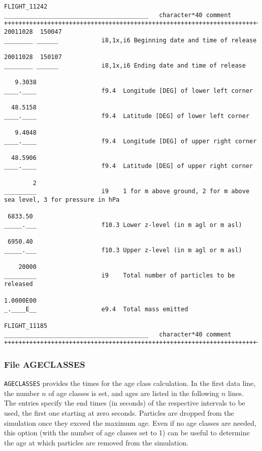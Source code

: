 \documentclass{egu}            %
\begin{document}
\begin{scriptsize}
\begin{verbatim}
FLIGHT_11242
________________________________________   character*40 comment
+++++++++++++++++++++++++++++++++++++++++++++++++++++++++++++++++++++++++
20011028  150047
________ ______            i8,1x,i6 Beginning date and time of release

20011028  150107
________ ______            i8,1x,i6 Ending date and time of release

   9.3038 
____.____                  f9.4  Longitude [DEG] of lower left corner

  48.5158
____.____                  f9.4  Latitude [DEG] of lower left corner

   9.4048
____.____                  f9.4  Longitude [DEG] of upper right corner

  48.5906
____.____                  f9.4  Latitude [DEG] of upper right corner

        2
_________                  i9    1 for m above ground, 2 for m above sea level, 3 for pressure in hPa

 6833.50
_____.___                  f10.3 Lower z-level (in m agl or m asl)
 
 6950.40
_____.___                  f10.3 Upper z-level (in m agl or m asl)
 
    20000                
_________                  i9    Total number of particles to be released

1.0000E00
_.____E__                  e9.4  Total mass emitted

FLIGHT_11185
________________________________________   character*40 comment
+++++++++++++++++++++++++++++++++++++++++++++++++++++++++++++++++++++++++

\end{verbatim}\end{scriptsize}

\newpage

\subsubsection{File AGECLASSES}

\verb|AGECLASSES| provides the times for the age class calculation.  In the
first data line, the number $n$ of age classes is set, and ages are listed in
the following $n$ lines.  The entries specify the end times (in seconds) of the
respective intervals to be used, the first one starting at zero seconds.
Particles are dropped from the simulation once they exceed the maximum age.
Even if no age classes are needed, this option (with the number of age classes
set to 1) can be useful to determine the age at which particles are removed
from the simulation.
\end{document}
